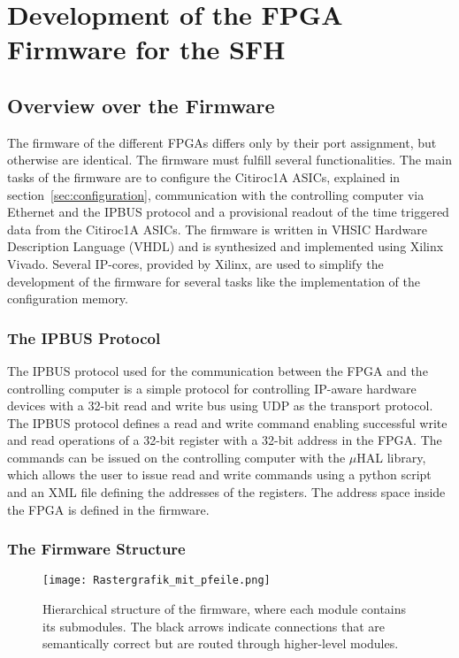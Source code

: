 \chapter{Development of the FPGA Firmware for the SFH}\label{cha:development}
\noindent
\section{Overview over the Firmware}
The firmware of the different FPGAs differs only by their port assignment, but otherwise are identical.
\newline
The firmware must fulfill several functionalities.
\newline
The main tasks of the firmware are to configure the Citiroc1A ASICs, explained in section~\ref{sec:configuration},
communication with the controlling computer via Ethernet and the IPBUS protocol and a provisional readout of the time triggered data from the Citiroc1A ASICs.
\newline
The firmware is written in VHSIC Hardware Description Language (VHDL) and is synthesized and implemented using Xilinx Vivado.
Several IP-cores, provided by Xilinx, are used to simplify the development of the firmware for several tasks like the implementation of the configuration memory.
\subsection{The IPBUS Protocol}
The IPBUS protocol used for the communication between the FPGA and the controlling computer is a simple protocol for controlling IP-aware hardware devices with a 32-bit read and write bus using UDP as the transport protocol\autocite{IPBUS_article}.
\newline
The IPBUS protocol defines a read and write command enabling successful write and read operations of a 32-bit register with a 32-bit address in the FPGA.    
\newline
The commands can be issued on the controlling computer with the $\mu$HAL library, which allows the user to issue read and write commands using a python script and an XML file defining the addresses of the registers\autocite{IPBUS_article}.
\newline
The address space inside the FPGA is defined in the firmware. 
\subsection{The Firmware Structure}

\begin{figure}[H]
    \centering
    \texttt{[image: Rastergrafik\_mit\_pfeile.png]}%
    \caption{Hierarchical structure of the firmware, where each module contains its submodules.
    The black arrows indicate connections that are semantically correct but are routed through higher-level modules.}
    \label{fig:Firmware_structure}
\end{figure}

